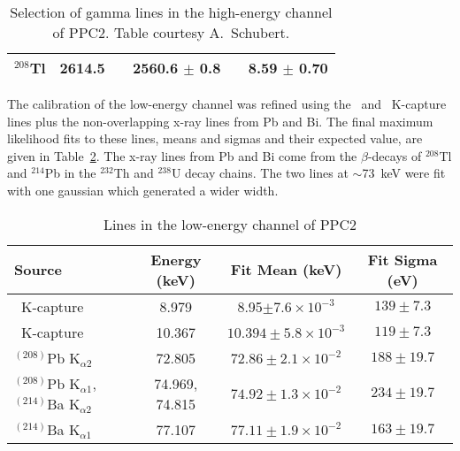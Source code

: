 \begin{table}
\begin{tabular}{  c | r | r | c  }
					$^{208}$Tl    & 2614.5    ~ & 2560.6     ${\pm}$ 0.8       ~ & 8.59       ${\pm}$ 0.70       \\
					\hline
					\end{tabular}

				
					\caption{Selection of gamma lines in the high-energy channel of PPC2.  Table courtesy A.~Schubert.}
					\label{tab:PPC2HighEnergyGammaLines}
				\end{table}
	
	The calibration of the low-energy channel was refined using the \gersixeight~and \znsixfive~K-capture lines plus the non-overlapping x-ray lines from Pb and Bi.  The final maximum likelihood fits to these lines, means and sigmas and their expected value, are given in Table~\ref{tab:PPCLowEnergyLines}.  The x-ray lines from Pb and Bi come from the $\beta$-decays of $^{208}$Tl and $^{214}$Pb in the $^{232}$Th and $^{238}$U decay chains.  The two lines at $\sim$73~keV were fit with one gaussian which generated a wider width.  
				\begin{table}
					\begin{tabular}{l|c|c|c}
						Source & Energy (keV) & Fit Mean (keV) & Fit Sigma (eV) \\
						\hline						
						\znsixfive~K-capture & 8.979 & 8.95$\pm7.6\times10^{-3}$ & $139 \pm 7.3$ \\
						\hline
						\gersixeight~K-capture & 10.367 & $10.394\pm5.8\times10^{-3}$ & $119 \pm 7.3$ \\
						\hline
						$^{(208)}$Pb K$_{\alpha2}$ & 72.805 & $72.86\pm2.1\times10^{-2}$ & $188 \pm 19.7$ \\
						\hline
						$^{(208)}$Pb K$_{\alpha1}$, $^{(214)}$Ba K$_{\alpha2}$ & 74.969, 74.815 & $74.92\pm1.3\times10^{-2}$ & $234 \pm 19.7$ \\
						\hline
						$^{(214)}$Ba K$_{\alpha1}$ & 77.107& $77.11\pm1.9\times10^{-2}$ & $163 \pm 19.7$ \\				
						\hline																
					\end{tabular}
					\caption{Lines in the low-energy channel of PPC2}
					\label{tab:PPCLowEnergyLines}
				\end{table}

